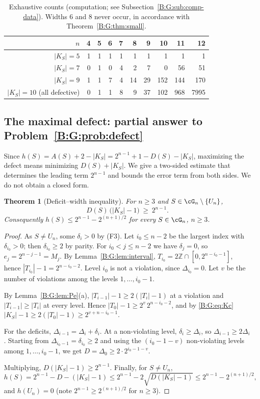 \documentclass[11pt,a4paper]{article}
\newtheorem{theorem}{Theorem}[section]
\theoremstyle{definition}
\theoremstyle{remark}
\numberwithin{equation}{section}
\begin{document}
\begin{table}[ht]
\centering\small
\begin{tabular}{rrrrrrrrrr}
\toprule
$n$ & 4 & 5 & 6 & 7 & 8 & 9 & 10 & 11 & 12\\
\midrule
$|K_S|=5$ & 1 & 1 & 1 & 1 & 1 & 1 & 1 & 1 & 1\\
$|K_S|=7$ & 0 & 1 & 0 & 4 & 2 & 7 & 0 & 56 & 51\\
$|K_S|=9$ & 1 & 1 & 7 & 4 & 14 & 29 & 152 & 144 & 170\\
$|K_S|=10$ (all defective) & 0 & 1 & 1 & 8 & 9 & 37 & 102 & 968 & 7995\\
\bottomrule
\end{tabular}
\caption{Exhaustive counts (computation; see Subsection~\ref{B:G:sub:comp-data}). Widths $6$ and
$8$ never occur, in accordance with Theorem~\ref{B:G:thm:small}.}\label{B:G:tab:small}
\end{table}

\subsection{The maximal defect: partial answer to Problem~\ref{B:G:prob:defect}}\label{B:G:sub:defect}

Since $h(S)=A(S)+2-|K_S|=2^{n-1}+1-D(S)-|K_S|$, maximizing the defect means minimizing
$D(S)+|K_S|$. We give a two-sided estimate that determines the leading term
$2^{n-1}$ and bounds the error term from both sides. We do not obtain a closed form.

\begin{theorem}[Deficit--width inequality]\label{B:G:thm:uncertainty}
For $n\ge3$ and $S\in\cG_n\setminus\{U_n\}$,
\[
 D(S)\,\bigl(|K_S|-1\bigr)\ \ge\ 2^{n-1}.
\]
Consequently $h(S)\le2^{n-1}-2^{(n+1)/2}$ for every $S\in\cG_n$, $n\ge3$.
\end{theorem}

\begin{proof}
As $S\ne U_n$, some $\delta_i>0$ by (F3). Let $i_0\le n-2$ be the largest index with
$\delta_{i_0}>0$; then $\delta_{i_0}\ge2$ by parity. For $i_0<j\le n-2$ we have $\delta_j=0$,
so $e_j=2^{n-j-1}=M_j$. By Lemma~\ref{B:G:lem:interval}, $T_{i_0}=2\mathbb{Z}\cap[0,2^{n-i_0-1}]$, hence
$|T_{i_0}|-1=2^{n-i_0-2}$. Level $i_0$ is not a violation, since $\Delta_{i_0}=0$. Let $v$ be the
number of violations among the levels $1,\dots,i_0-1$.

By Lemma~\ref{B:G:lem:Pe}(a), $|T_{i-1}|-1\ge2(|T_i|-1)$ at a violation and $|T_{i-1}|\ge|T_i|$ at
every level. Hence $|T_0|-1\ge2^{v}\,2^{n-i_0-2}$, and by \eqref{B:G:eq:Kc}
$|K_S|-1\ge2(|T_0|-1)\ge2^{v+n-i_0-1}$.

For the deficits, $\Delta_{i-1}=\Delta_i+\delta_i$. At a non-violating level, $\delta_i\ge\Delta_i$,
so $\Delta_{i-1}\ge2\Delta_i$. Starting from $\Delta_{i_0-1}=\delta_{i_0}\ge2$ and using the
$(i_0-1-v)$ non-violating levels among $1,\dots,i_0-1$, we get $D=\Delta_0\ge2\cdot2^{i_0-1-v}$.

Multiplying, $D(|K_S|-1)\ge2^{n-1}$. Finally, for $S\ne U_n$,
\[
 h(S)=2^{n-1}-D-(|K_S|-1)\le2^{n-1}-2\sqrt{D(|K_S|-1)}\le2^{n-1}-2^{(n+1)/2},
\]
and $h(U_n)=0$ (note $2^{n-1}\ge2^{(n+1)/2}$ for $n\ge3$).
\end{proof}
\end{document}
